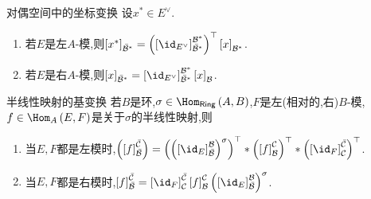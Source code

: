\begin{proposition}{对偶空间中的坐标变换}{}
	设$x^{\ast}\in E^{\vee}$.
	\begin{enumerate}
		\item 若$E$是左$A$-模,则$\left[x^{\ast}\right]_{\bar{\mathcal{B}}^{\ast}}=\left(\left[\id_{E^{\vee}}\right]_{\bar{\mathcal{B}}^{\ast}}^{\mathcal{B}^{\ast}}\right)^{\top}\left[x\right]_{\mathcal{B}^{\ast}}$.
		\item 若$E$是右$A$-模,则$\left[x\right]_{\bar{\mathcal{B}}^{\ast}}=\left[\id_{E^{\vee}}\right]_{\bar{\mathcal{B}}^{\ast}}^{\mathcal{B}^{\ast}}\left[x\right]_{\mathcal{B}}$.
	\end{enumerate}
\end{proposition}

\begin{remark}{半线性映射的基变换}{}
	若$B$是环,$\sigma\in\Hom_{\mathsf{Ring}}\left(A,B\right)$,$F$是左(相对的,右)$B$-模,$f\in\Hom_{A}\left(E,F\right)$是关于$\sigma$的半线性映射,则
	\begin{enumerate}
		\item 当$E,F$都是左模时,$\left(\left[f\right]_{\bar{\mathcal{B}}}^{\bar{\mathcal{C}}}\right)=\left(\left(\left[\id_{E}\right]_{\bar{\mathcal{B}}}^{\mathcal{B}}\right)^{\sigma}\right)^{\top}\ast\left(\left[f\right]_{\mathcal{B}}^{\mathcal{C}}\right)^{\top}\ast\left(\left[\id_{F}\right]_{\mathcal{C}}^{\bar{\mathcal{C}}}\right)^{\top}$.
		\item 当$E,F$都是右模时,$\left[f\right]_{\bar{\mathcal{B}}}^{\bar{\mathcal{C}}}=\left[\id_{F}\right]_{\mathcal{C}}^{\bar{\mathcal{C}}}\left[f\right]_{\mathcal{B}}^{\mathcal{C}}\left(\left[\id_{E}\right]_{\bar{\mathcal{B}}}^{\mathcal{B}}\right)^{\sigma}$.
	\end{enumerate}
\end{remark}







